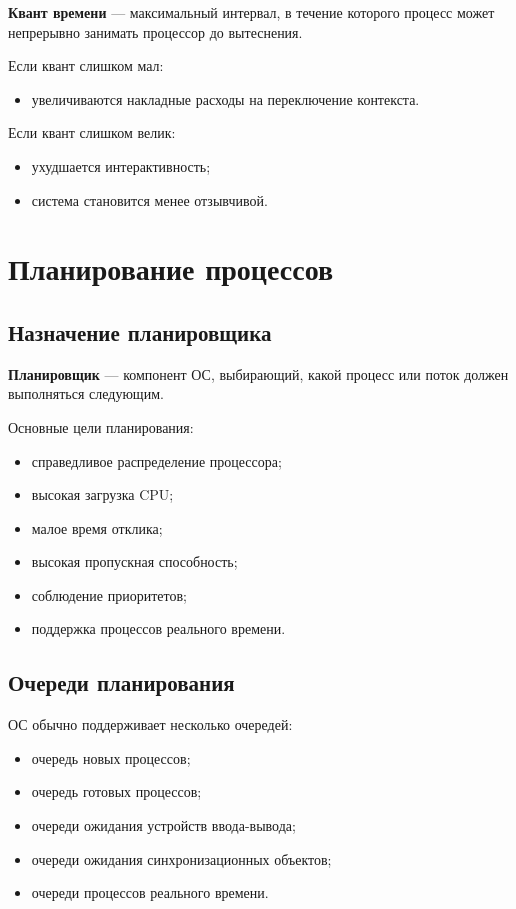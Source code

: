 \documentclass[12pt,a4paper]{article}
\begin{document}
\textbf{Квант времени} --- максимальный интервал, в течение которого процесс может непрерывно занимать процессор до вытеснения.

Если квант слишком мал:
\begin{itemize}
    \item увеличиваются накладные расходы на переключение контекста.
\end{itemize}

Если квант слишком велик:
\begin{itemize}
    \item ухудшается интерактивность;
    \item система становится менее отзывчивой.
\end{itemize}

\section{Планирование процессов}

\subsection{Назначение планировщика}

\textbf{Планировщик} --- компонент ОС, выбирающий, какой процесс или поток должен выполняться следующим.

Основные цели планирования:
\begin{itemize}
    \item справедливое распределение процессора;
    \item высокая загрузка CPU;
    \item малое время отклика;
    \item высокая пропускная способность;
    \item соблюдение приоритетов;
    \item поддержка процессов реального времени.
\end{itemize}

\subsection{Очереди планирования}

ОС обычно поддерживает несколько очередей:

\begin{itemize}
    \item очередь новых процессов;
    \item очередь готовых процессов;
    \item очереди ожидания устройств ввода-вывода;
    \item очереди ожидания синхронизационных объектов;
    \item очереди процессов реального времени.
\end{itemize}
\end{document}
